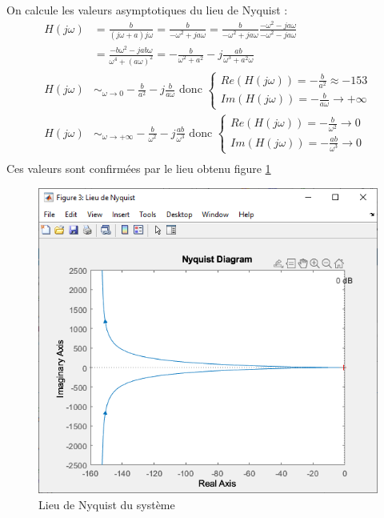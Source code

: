 \documentclass{article}
\begin{document}
\subsection{}
On calcule les valeurs asymptotiques du lieu de Nyquist :
\begin{align*}
    H(j\omega)&=\frac{b}{(j\omega+a)j\omega}=\frac{b}{-\omega^2+ja\omega}=\frac{b}{-\omega^2+ja\omega}\frac{-\omega^2-ja\omega}{-\omega^2-ja\omega}\\
    &=\frac{-b\omega^2-jab\omega}{\omega^4+(a\omega)^2}=-\frac{b}{\omega^2+a^2}-j\frac{ab}{\omega^3+a^2\omega}\\
    H(j\omega)&\sim_{\omega\rightarrow0}-\frac{b}{a^2}-j\frac{b}{a\omega}\text{ donc }\begin{cases}
        Re(H(j\omega))=-\frac{b}{a^2}\approx-153\\
        Im(H(j\omega))=-\frac{b}{a\omega}\rightarrow+\infty
    \end{cases}\\
    H(j\omega)&\sim_{\omega\rightarrow+\infty}-\frac{b}{\omega^2}-j\frac{ab}{\omega^3}\text{ donc }\begin{cases}
        Re(H(j\omega))=-\frac{b}{\omega^2}\rightarrow0\\
        Im(H(j\omega))=-\frac{ab}{\omega^3}\rightarrow0
    \end{cases}\\
\end{align*}
Ces valeurs sont confirmées par le lieu obtenu figure \ref{fig:nyquist114}
\begin{figure}[h]
    \centering
    \includegraphics[width=0.5\linewidth]{nysquist114.PNG}
    \caption{Lieu de Nyquist du système}
    \label{fig:nyquist114}
\end{figure}
\end{document}
